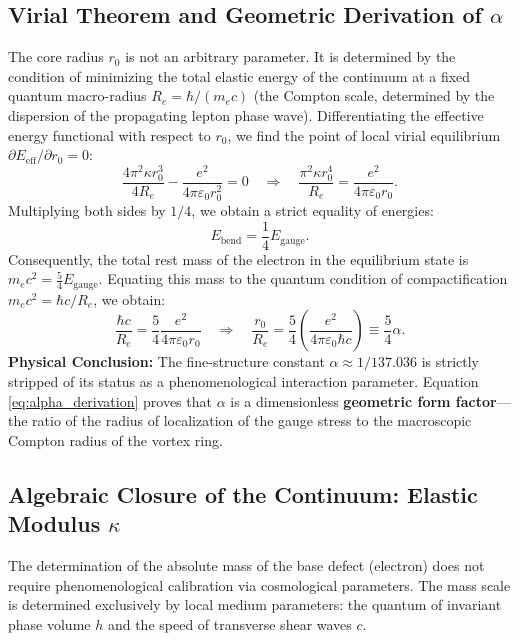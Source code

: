 \documentclass[11pt,a4paper]{article}
\begin{document}
\subsection{Virial Theorem and Geometric Derivation of $\alpha$}
The core radius $r_0$ is not an arbitrary parameter. It is determined by the condition of minimizing the total elastic energy of the continuum at a fixed quantum macro-radius $R_e = \hbar / (m_e c)$ (the Compton scale, determined by the dispersion of the propagating lepton phase wave).
Differentiating the effective energy functional with respect to $r_0$, we find the point of local virial equilibrium $\partial E_{\text{eff}} / \partial r_0 = 0$:
\begin{equation}
\frac{4 \pi^2 \kappa r_0^3}{4R_e} - \frac{e^2}{4\pi\varepsilon_0 r_0^2} = 0 \quad \Longrightarrow \quad \frac{\pi^2 \kappa r_0^4}{R_e} = \frac{e^2}{4\pi\varepsilon_0 r_0}.
\end{equation}
Multiplying both sides by $1/4$, we obtain a strict equality of energies:
\begin{equation}
E_{\text{bend}} = \frac{1}{4} E_{\text{gauge}}.
\end{equation}
Consequently, the total rest mass of the electron in the equilibrium state is $m_e c^2 = \frac{5}{4} E_{\text{gauge}}$. Equating this mass to the quantum condition of compactification $m_e c^2 = \hbar c / R_e$, we obtain:
\begin{equation}
\frac{\hbar c}{R_e} = \frac{5}{4} \frac{e^2}{4\pi\varepsilon_0 r_0} \quad \Longrightarrow \quad \frac{r_0}{R_e} = \frac{5}{4} \left( \frac{e^2}{4\pi\varepsilon_0 \hbar c} \right) \equiv \frac{5}{4} \alpha.
\label{eq:alpha_derivation}
\end{equation}
\textbf{Physical Conclusion:} The fine-structure constant $\alpha \approx 1/137.036$ is strictly stripped of its status as a phenomenological interaction parameter. Equation \eqref{eq:alpha_derivation} proves that $\alpha$ is a dimensionless \textbf{geometric form factor}—the ratio of the radius of localization of the gauge stress to the macroscopic Compton radius of the vortex ring.

\subsection{Algebraic Closure of the Continuum: Elastic Modulus $\kappa$}
The determination of the absolute mass of the base defect (electron) does not require phenomenological calibration via cosmological parameters. The mass scale is determined exclusively by local medium parameters: the quantum of invariant phase volume $h$ and the speed of transverse shear waves $c$.
\end{document}
